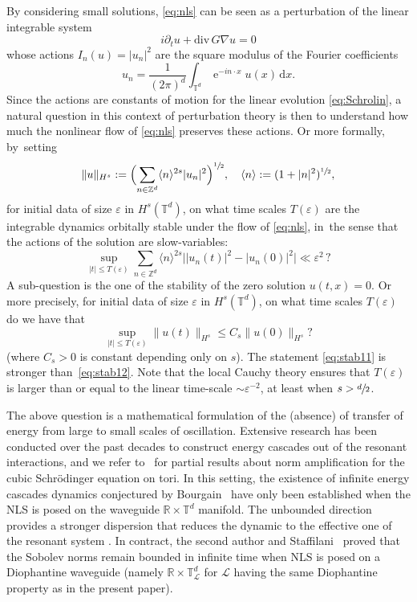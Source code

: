 \documentclass[JEP,XML,SOM,Unicode,published]{cedram}
\theoremstyle{plain}
\theoremstyle{definition}
\DeclareMathOperator{\e}{e}
\newcommand{\Z}{\mathbb{Z}}
\newcommand{\R}{\mathbb{R}}
\newcommand{\T}{\mathbb{T}}
\newcommand{\1}{\mathbf{1}}
\let\epsilon\varepsilon
\begin{document}
By considering small solutions, \eqref{eq:nls} can be seen as a perturbation of the linear integrable system
\begin{equation}
\label{eq:Schrolin}
i\partial_{t}u + \mathrm{div} \, G \nabla u = 0
\end{equation}
whose actions $I_n(u) = |u_n|^2$ are the square modulus of the Fourier coefficients
\[
u_{n} = \frac{1}{(2\pi)^d}\int_{\T^{d}}\e^{-in\cdot x}u(x)\, \mathrm{d}x.
\]
Since the actions are constants of motion for the linear evolution \eqref{eq:Schrolin}, a natural question in this context of perturbation theory is then to understand how much the nonlinear flow of \eqref{eq:nls} preserves these actions. Or more formally, by~setting
\[
\|u\|_{H^{s}}:=\Bigl(\sum_{n\in\Z^{d}}\langle n\rangle^{2s}|u_{n}|^{2}\Bigr)^{\sfrac{1}{2}},\quad \langle n\rangle:= (1+|n|^{2})^{\sfrac{1}{2}},
\]
for initial data of size $\varepsilon$ in $H^{s}(\mathbb{T}^{d})$, on what time scales $T(\epsilon)$ are the integrable dynamics orbitally stable under the flow of \eqref{eq:nls}, in~the sense that the actions of the solution are slow-variables:
\begin{equation}
\label{eq:stab11}
\sup_{|t|\leq T(\epsilon)}\sum_{n\in\Z^d} \langle n\rangle^{2s}
\big|
|u_{n}(t)|^{2}
-
|u_{n}(0)|^{2}
\big| \ll \varepsilon^{2} \,?
\end{equation}
A sub-question is the one of the stability of the zero solution $u(t,x)=0$. Or more precisely, for initial data of size $\varepsilon$ in $H^{s}(\mathbb{T}^{d})$, on what time scales $T(\epsilon)$ do we have that
\begin{equation}
\label{eq:stab12}
\sup_{|t|\leq T(\epsilon)}\|u(t)\|_{H^{s}} \leq C_s\|u(0)\|_{H^{s}} ?
\end{equation}
(where $C_s>0$ is constant depending only on $s$). The statement \eqref{eq:stab11} is stronger than~\eqref{eq:stab12}. Note that the local Cauchy theory ensures that $T(\varepsilon)$ is larger than or equal to the linear time-scale $\sim\varepsilon^{-2}$, at least when $s>\sfrac{d}{2}$.

The above question is a mathematical formulation of the (absence) of transfer of energy from large to small scales of oscillation. Extensive research has been conducted over the past decades to construct energy cascades out of the resonant interactions, and we refer to~\cite{CKSTT,GG22,GK15} for partial results about norm amplification for the cubic Schrödinger equation on tori. In this setting, the existence of infinite energy cascades dynamics conjectured by Bourgain~\cite{Bourgain-conj-00} have only been established when the NLS is posed on the waveguide $\R\times\T^{d}$ manifold. The unbounded direction provides a stronger dispersion that reduces the dynamic to the effective one of the resonant system \cite{HPTV15}. In contract, the second author and Staffilani~\cite{CS24,C25} proved that the Sobolev norms remain bounded in infinite time when NLS is posed on a Diophantine waveguide (namely $\R\times\T_{\mathscr{L}}^{d}$ for $\mathscr{L}$ having the same Diophantine property as in the present paper).
\end{document}
